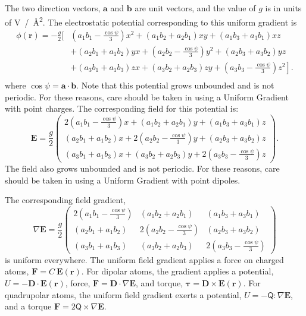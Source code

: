 \documentclass[]{book}
\begin{document}
The two direction vectors, $\mathbf{a}$ and $\mathbf{b}$ are unit
vectors, and the value of $g$ is in units of
V~/~\AA\textsuperscript{2}. The electrostatic potential corresponding
to this uniform gradient is
\begin{align}
\phi(\mathbf{r})  = - \frac{g}{2} \Big[&
    \left(a_1 b_1 - \frac{\cos\psi}{3}\right) x^2
    + (a_1 b_2 + a_2 b_1) x y + (a_1 b_3 + a_3 b_1) x z \\
    & + (a_2 b_1 + a_1 b_2) y x 
    + \left(a_2 b_2 - \frac{\cos\psi}{3}\right) y^2
    + (a_2 b_3 + a_3 b_2) y z \\
    & \left. + (a_3 b_1 + a_1 b_3) z x 
    + (a_3 b_2 + a_2 b_3) z y
    + \left(a_3 b_3 - \frac{\cos\psi}{3}\right) z^2 \right]. \\
\end{align}
where $\cos \psi = \mathbf{a} \cdot \mathbf{b}$.  Note that this
potential grows unbounded and is not periodic.  For these reasons,
care should be taken in using a Uniform Gradient with point
charges. The corresponding field for this potential is:
\begin{equation}
\mathbf{E} = \frac{g}{2} \left( \begin{array}{c} 
    2\left(a_1 b_1 - \frac{\cos\psi}{3}\right) x +  (a_1 b_2 + a_2 b_1) y 
    + (a_1 b_3 + a_3 b_1) z  \\
    (a_2 b_1 + a_1 b_2)  x + 2 \left(a_2 b_2 - \frac{\cos\psi}{3}\right) y 
    + (a_2 b_3 + a_3 b_2) z \\
    (a_3 b_1 + a_1 b_3) x +  (a_3 b_2 + a_2 b_3) y 
    + 2 \left(a_3 b_3 - \frac{\cos\psi}{3}\right) z \end{array}
\right).
\end{equation}
The field also grows unbounded and is not periodic.  For these reasons,
care should be taken in using a Uniform Gradient with point dipoles.

The corresponding field gradient,
\begin{equation}
\nabla \mathbf{E} = \frac{g}{2} \left( \begin{array}{ccc}  
    2\left(a_1 b_1 - \frac{\cos\psi}{3}\right)  &  
    (a_1 b_2 + a_2 b_1) & (a_1 b_3 + a_3 b_1) \\
    (a_2 b_1 + a_1 b_2)  & 2 \left(a_2 b_2 - \frac{\cos\psi}{3}\right) & 
    (a_2 b_3 + a_3 b_2) \\
    (a_3 b_1 + a_1 b_3) & (a_3 b_2 + a_2 b_3) & 
    2 \left(a_3 b_3 - \frac{\cos\psi}{3}\right) \end{array} \right)
\end{equation}
is uniform everywhere. The uniform field gradient applies a force on
charged atoms, $\mathbf{F} = C~\mathbf{E}(\mathbf{r})$.  For dipolar
atoms, the gradient applies a potential, $U = -\mathbf{D} \cdot
\mathbf{E}(\mathbf{r})$, force, $\mathbf{F} = \mathbf{D} \cdot
\nabla \mathbf{E}$, and torque, $ \mathbf{\tau} = \mathbf{D} \times
\mathbf{E}(\mathbf{r})$.  For quadrupolar atoms, the uniform field
gradient exerts a potential, $U = - \mathsf{Q}:\nabla \mathbf{E}$, and
a torque $ \mathbf{F} = 2 \mathsf{Q} \times \nabla \mathbf{E}$.
\end{document}

